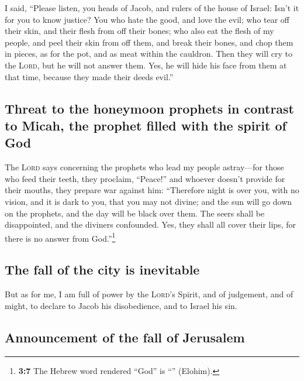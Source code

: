  I said, ``Please listen, you heads of Jacob, and rulers
of the house of Israel: Isn't it for you to know justice? 
You who hate the good, and love the evil; who tear off their skin, and
their flesh from off their bones;  who also eat the flesh
of my people, and peel their skin from off them, and break their bones,
and chop them in pieces, as for the pot, and as meat within the
cauldron.  Then they will cry to the \textsc{Lord}, but he
will not answer them. Yes, he will hide his face from them at that time,
because they made their deeds evil.''

\hypertarget{threat-to-the-honeymoon-prophets-in-contrast-to-micah-the-prophet-filled-with-the-spirit-of-god}{%
\subsection{Threat to the honeymoon prophets in contrast to Micah, the
prophet filled with the spirit of
God}\label{threat-to-the-honeymoon-prophets-in-contrast-to-micah-the-prophet-filled-with-the-spirit-of-god}}

 The \textsc{Lord} says concerning the prophets who lead
my people astray---for those who feed their teeth, they proclaim,
``Peace!'' and whoever doesn't provide for their mouths, they prepare
war against him:  ``Therefore night is over you, with no
vision, and it is dark to you, that you may not divine; and the sun will
go down on the prophets, and the day will be black over them.
 The seers shall be disappointed, and the diviners
confounded. Yes, they shall all cover their lips, for there is no answer
from God.''\footnote{\textbf{3:7} The Hebrew word rendered ``God'' is
  ``'' (Elohim).}

\hypertarget{the-fall-of-the-city-is-inevitable}{%
\subsection{The fall of the city is
inevitable}\label{the-fall-of-the-city-is-inevitable}}

 But as for me, I am full of power by the \textsc{Lord}'s
Spirit, and of judgement, and of might, to declare to Jacob his
disobedience, and to Israel his sin.

\hypertarget{announcement-of-the-fall-of-jerusalem}{%
\subsection{Announcement of the fall of
Jerusalem}\label{announcement-of-the-fall-of-jerusalem}}

